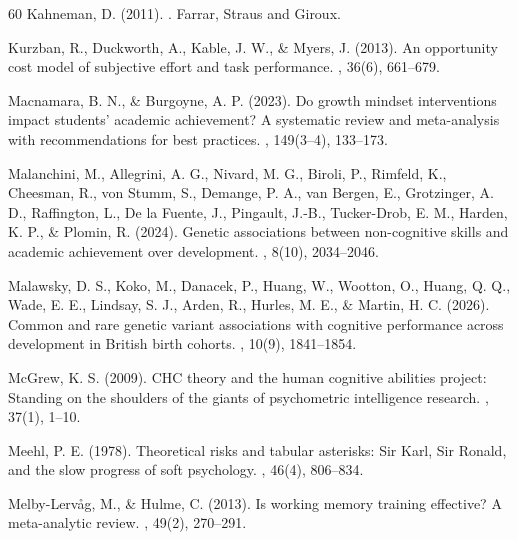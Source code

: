 \documentclass[12pt,a4paper]{article}
\begin{document}
\begin{thebibliography}{60}
Kahneman, D. (2011).
.
\newblock Farrar, Straus and Giroux.

Kurzban, R., Duckworth, A., Kable, J. W., \& Myers, J. (2013).
\newblock An opportunity cost model of subjective effort and task performance.
, 36(6), 661--679.

Macnamara, B. N., \& Burgoyne, A. P. (2023).
\newblock Do growth mindset interventions impact students' academic achievement? A systematic review and meta-analysis with recommendations for best practices.
, 149(3--4), 133--173.

Malanchini, M., Allegrini, A. G., Nivard, M. G., Biroli, P., Rimfeld, K., Cheesman, R., von Stumm, S., Demange, P. A., van Bergen, E., Grotzinger, A. D., Raffington, L., De la Fuente, J., Pingault, J.-B., Tucker-Drob, E. M., Harden, K. P., \& Plomin, R. (2024).
\newblock Genetic associations between non-cognitive skills and academic achievement over development.
, 8(10), 2034--2046.

Malawsky, D. S., Koko, M., Danacek, P., Huang, W., Wootton, O., Huang, Q. Q., Wade, E. E., Lindsay, S. J., Arden, R., Hurles, M. E., \& Martin, H. C. (2026).
\newblock Common and rare genetic variant associations with cognitive performance across development in British birth cohorts.
, 10(9), 1841--1854.

McGrew, K. S. (2009).
\newblock CHC theory and the human cognitive abilities project: Standing on the shoulders of the giants of psychometric intelligence research.
, 37(1), 1--10.

Meehl, P. E. (1978).
\newblock Theoretical risks and tabular asterisks: Sir Karl, Sir Ronald, and the slow progress of soft psychology.
, 46(4), 806--834.

Melby-Lerv\aa{}g, M., \& Hulme, C. (2013).
\newblock Is working memory training effective? A meta-analytic review.
, 49(2), 270--291.


\end{thebibliography}
\end{document}
